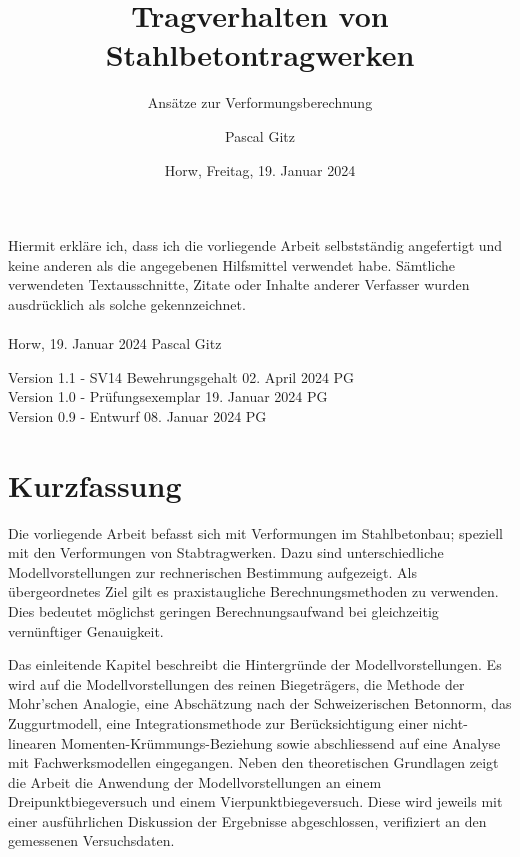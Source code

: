 \documentclass[
  12pt,
  letterpaper,
  egregdoesnotlikesansseriftitles]{scrreprt}
\title{Tragverhalten von Stahlbetontragwerken}
\subtitle
{Ansätze zur Verformungsberechnung}
\date{\large Horw, Freitag, 19. Januar 2024}
\author{Pascal Gitz}
\begin{document}
\maketitle


Hiermit erkläre ich, dass ich die vorliegende Arbeit selbstständig angefertigt und keine anderen als die angegebenen Hilfsmittel verwendet habe. Sämtliche verwendeten Textausschnitte, Zitate oder Inhalte anderer Verfasser wurden ausdrücklich als solche gekennzeichnet.\\%
%
\\%
%
Horw, 19. Januar 2024 \hfill Pascal Gitz%

\vfill

Version 1.1 - SV14 Bewehrungsgehalt \hfill 02. April 2024 \quad \quad \quad \quad \quad PG\\
Version 1.0 - Prüfungsexemplar \hfill 19. Januar 2024 \quad \quad \quad \quad \quad PG\\
Version 0.9 - Entwurf \hfill 08. Januar 2024 \quad \quad \quad \quad \quad PG\\

\newpage

\chapter*{Kurzfassung}

Die vorliegende Arbeit befasst sich mit Verformungen im Stahlbetonbau; speziell mit den Verformungen von Stabtragwerken. Dazu sind unterschiedliche Modellvorstellungen zur rechnerischen Bestimmung aufgezeigt. Als übergeordnetes Ziel gilt es praxistaugliche Berechnungsmethoden zu verwenden. Dies bedeutet möglichst geringen Berechnungsaufwand bei gleichzeitig vernünftiger Genauigkeit.  

Das einleitende Kapitel beschreibt die Hintergründe der Modellvorstellungen. Es wird auf die Modellvorstellungen des reinen Biegeträgers, die Methode der Mohr'schen Analogie, eine Abschätzung nach der Schweizerischen Betonnorm, das Zuggurtmodell, eine Integrationsmethode zur Berücksichtigung einer nicht-linearen Momenten-Krümmungs-Beziehung sowie abschliessend auf eine Analyse mit Fachwerksmodellen eingegangen. Neben den theoretischen Grundlagen zeigt die Arbeit die Anwendung der Modellvorstellungen an einem Dreipunktbiegeversuch und einem Vierpunktbiegeversuch. Diese wird jeweils mit einer ausführlichen Diskussion der Ergebnisse abgeschlossen, verifiziert an den gemessenen Versuchsdaten. 
\end{document}
